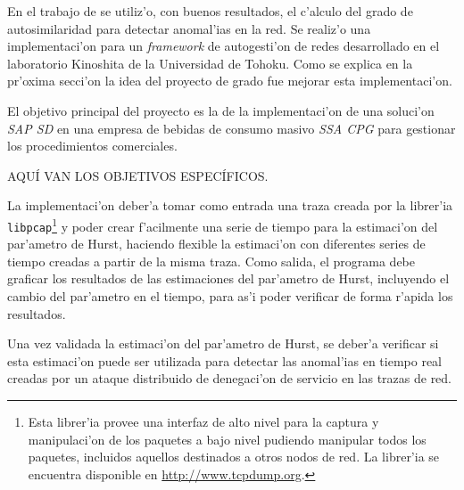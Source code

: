 En el trabajo de \cite{mingliddos} se utiliz'o, con buenos resultados, el
c'alculo del grado de autosimilaridad para detectar anomal'ias en la red. Se
realiz'o una implementaci'on para un {\it framework} de autogesti'on de redes
desarrollado en el laboratorio Kinoshita de la Universidad de Tohoku. Como se
explica en la pr'oxima secci'on la idea del proyecto de grado fue mejorar esta
implementaci'on.

\vspace{5 mm}

\label{sect:objetivo_general}
\vspace{5 mm}

\indent El objetivo principal del proyecto es la de la implementaci'on de una soluci'on \emph{SAP SD} en una empresa de bebidas de consumo masivo \emph{SSA CPG} para gestionar los procedimientos comerciales. 


\vspace{5 mm}

\label{sect:objetivos_especificos}
\vspace{5 mm}

AQU\'I VAN LOS OBJETIVOS ESPEC\'IFICOS.

La implementaci'on deber'a tomar como entrada una traza creada por la librer'ia
{\tt libpcap}\footnote{Esta librer'ia provee una interfaz de alto nivel para la
captura y manipulaci'on de los paquetes a bajo nivel pudiendo manipular todos 
los paquetes, incluidos aquellos destinados a otros nodos de red. La librer'ia
se encuentra disponible en \url{http://www.tcpdump.org}.} y poder
crear f'acilmente una serie de tiempo para la estimaci'on del par'ametro de
Hurst, haciendo flexible la estimaci'on con diferentes series de tiempo creadas
a partir de la misma traza. Como salida, el programa debe graficar los
resultados de las estimaciones del par'ametro de Hurst, incluyendo el cambio del
par'ametro en el tiempo, para as'i poder verificar de forma r'apida los
resultados. 

Una vez validada la estimaci'on del par'ametro de Hurst, se deber'a verificar si
esta estimaci'on puede ser utilizada para detectar las anomal'ias en tiempo
real creadas por un ataque distribuido de denegaci'on de servicio en las trazas
de red.



